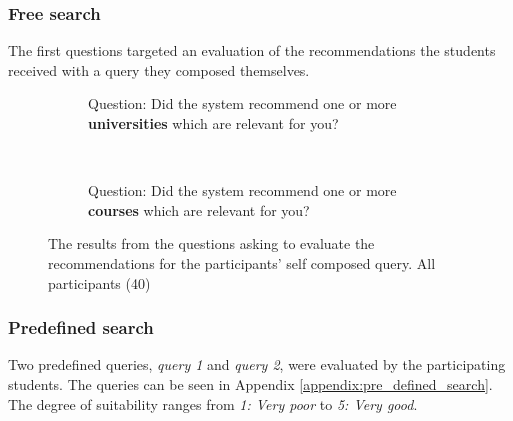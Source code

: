 \subsubsection{Free search}

The first questions targeted an evaluation of the recommendations the students received with a query they composed themselves.

\begin{figure}[h]
    \centering
    \begin{subfigure}[b]{0.4\textwidth}
        
        \caption{Question: Did the system recommend one or more \textbf{universities} which are relevant for you?}
        \label{fig:gull}
    \end{subfigure}
    ~ \qquad %
    \begin{subfigure}[b]{0.4\textwidth}
       
        \caption{Question: Did the system recommend one or more \textbf{courses} which are relevant for you?}
        \label{fig:tiger}
    \end{subfigure}
    \caption{The results from the questions asking to evaluate the recommendations for the participants' self composed query. All participants (40)}
\end{figure}

\subsubsection{Predefined search}

Two predefined queries, \textit{query 1} and \textit{query 2}, were evaluated by the participating students. The queries can be seen in Appendix \ref{appendix:pre_defined_search}. The degree of suitability ranges from \textit{1: Very poor} to \textit{5: Very good}.

